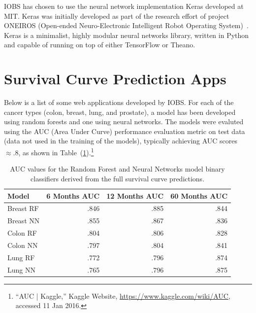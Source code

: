 \documentclass[a4paper,11pt]{article}
\begin{document}
IOBS has chosen to use the neural network implementation Keras developed at MIT.
Keras was initially developed as part of the research effort of project ONEIROS (Open-ended Neuro-Electronic Intelligent Robot Operating System)~\cite{keras}.
Keras is a minimalist, highly modular neural networks library, written in Python and capable of running on top of either TensorFlow or Theano.

\section{Survival Curve Prediction Apps}

Below is a list of some web applications developed by IOBS.
For each of the cancer types (colon, breast, lung, and prostate), a model has been developed using random forests and one using neural networks. The models were evaluted using the AUC (Area Under Curve) performance evaluation metric on test data (data not used in the training of the models), typically achieving AUC scores  $\approx .8$, as shown in Table~(\ref{tab:AUC}).\footnote{``AUC | Kaggle,'' Kaggle Website, \url{https://www.kaggle.com/wiki/AUC}, accessed 11 Jan 2016.}
 

\begin{table}[tbp]
\begin{center}
\begin{tabular}{lrrr}
\toprule
Model & 6 Months AUC & 12 Months AUC & 60 Months AUC \\ 
\midrule
Breast RF &  .846       &     .885           &  .844 \\ 
Breast NN &   .855      &     .867      &    .836 \\ 
Colon RF  &     .804          &      .806           &      .828           \\ 
Colon NN   &     .797          &          .804         &   .841  \\ 
Lung RF    &      .772               &        .796               &   .874  \\ 
Lung NN    &        .765              &        .796               &  .875  \\
\bottomrule
\end{tabular}
\caption{\label{tab:AUC} AUC values for the Random Forest and Neural Networks model
binary classifiers derived from the full survival curve predictions.}
\end{center}
\end{table}
\end{document}
